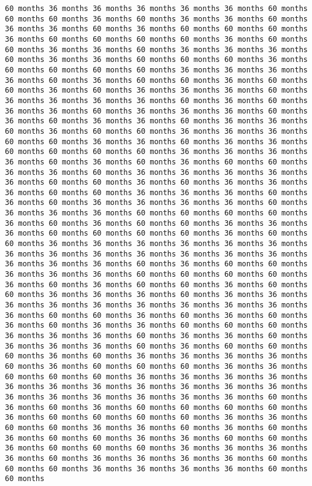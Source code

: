 \documentclass[11pt]{article}
\begin{document}
\begin{Verbatim}[commandchars=\\\{\}, frame=single, framerule=2mm, rulecolor=\color{outerrorbackground}]
60 months 36 months 36 months 36 months 36 months 36 months 60 months 60 months 60 months 36 months 60 months 36 months 36 months 60 months 36 months 36 months 60 months 36 months 60 months 60 months 60 months 36 months 60 months 60 months 60 months 60 months 36 months 60 months 60 months 36 months 36 months 60 months 36 months 36 months 36 months 60 months 36 months 36 months 60 months 60 months 60 months 36 months 60 months 60 months 60 months 60 months 36 months 36 months 36 months 36 months 60 months 36 months 60 months 60 months 36 months 60 months 60 months 36 months 60 months 36 months 36 months 36 months 60 months 36 months 36 months 36 months 36 months 60 months 36 months 60 months 36 months 36 months 60 months 36 months 36 months 36 months 60 months 36 months 60 months 36 months 36 months 60 months 36 months 36 months 60 months 36 months 60 months 60 months 36 months 36 months 36 months 60 months 60 months 36 months 36 months 60 months 36 months 36 months 60 months 60 months 60 months 60 months 36 months 36 months 36 months 36 months 60 months 36 months 60 months 36 months 60 months 60 months 36 months 36 months 60 months 36 months 36 months 36 months 36 months 36 months 60 months 60 months 36 months 60 months 36 months 36 months 36 months 60 months 60 months 36 months 36 months 36 months 60 months 36 months 60 months 36 months 36 months 36 months 36 months 60 months 36 months 36 months 36 months 60 months 60 months 60 months 60 months 36 months 60 months 36 months 60 months 60 months 36 months 36 months 36 months 60 months 60 months 60 months 60 months 36 months 60 months 60 months 36 months 36 months 36 months 36 months 36 months 36 months 36 months 36 months 36 months 36 months 36 months 36 months 36 months 36 months 36 months 36 months 60 months 36 months 60 months 60 months 36 months 36 months 36 months 60 months 60 months 60 months 60 months 36 months 60 months 36 months 60 months 60 months 36 months 60 months 60 months 36 months 36 months 36 months 60 months 36 months 36 months 36 months 36 months 36 months 36 months 36 months 36 months 36 months 36 months 60 months 60 months 36 months 60 months 36 months 60 months 36 months 60 months 36 months 36 months 60 months 60 months 60 months 36 months 36 months 36 months 60 months 36 months 36 months 60 months 36 months 36 months 36 months 60 months 36 months 60 months 60 months 60 months 36 months 60 months 36 months 36 months 36 months 36 months 60 months 36 months 60 months 60 months 60 months 36 months 36 months 60 months 60 months 60 months 36 months 36 months 36 months 36 months 36 months 36 months 36 months 36 months 36 months 36 months 36 months 36 months 36 months 36 months 36 months 36 months 36 months 60 months 36 months 60 months 36 months 60 months 60 months 60 months 60 months 36 months 60 months 60 months 60 months 60 months 36 months 36 months 60 months 60 months 36 months 36 months 60 months 36 months 60 months 36 months 60 months 60 months 36 months 36 months 60 months 60 months 36 months 60 months 60 months 60 months 36 months 36 months 36 months 36 months 60 months 36 months 36 months 36 months 36 months 60 months 60 months 60 months 36 months 36 months 36 months 36 months 60 months 60 months 
\end{Verbatim}
\end{document}
